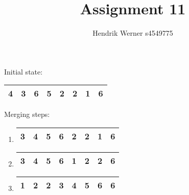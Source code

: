 \documentclass[12pt, a4paper]{article}
\title{Assignment 11}
\author{Hendrik Werner s4549775}
\begin{document}
\maketitle

\section{} %

\section{} %

\section{} %

\section{} %

Initial state:

\begin{tabular}{|c|c|c|c|c|c|c|c|}
	\hline
	4 & 3 & 6 & 5 & 2 & 2 & 1 & 6\\
	\hline
\end{tabular}

Merging steps:

\begin{enumerate}
	\item \begin{tabular}{|c|c|c|c|c|c|c|c|}
		\hline
		3 & 4 & 5 & 6 & 2 & 2 & 1 & 6\\
		\hline
	\end{tabular}
	\item \begin{tabular}{|c|c|c|c|c|c|c|c|}
		\hline
		3 & 4 & 5 & 6 & 1 & 2 & 2 & 6\\
		\hline
	\end{tabular}
	\item \begin{tabular}{|c|c|c|c|c|c|c|c|}
		\hline
		1 & 2 & 2 & 3 & 4 & 5 & 6 & 6\\
		\hline
	\end{tabular}
\end{enumerate}

\section{} %
\end{document}
